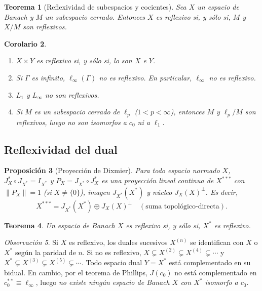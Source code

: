 \documentclass[11pt,a4paper]{article}
\newcommand{\norm}[1]{\lVert #1\rVert}
\theoremstyle{plain}
\newtheorem{teorema}{Teorema}[section]
\newtheorem{proposicion}[teorema]{Proposición}
\newtheorem{corolario}[teorema]{Corolario}
\theoremstyle{definition}
\theoremstyle{remark}
\newtheorem{observacion}[teorema]{Observación}
\begin{document}
\begin{teorema}[Reflexividad de subespacios y cocientes]
Sea $X$ un espacio de Banach y $M$ un subespacio cerrado. Entonces $X$ es reflexivo si, y sólo si, $M$ y $X/M$ son reflexivos.
\end{teorema}

\begin{corolario}
\begin{enumerate}[label=(\alph*)]
\item $X\times Y$ es reflexivo si, y sólo si, lo son $X$ e $Y$.
\item Si $\Gamma$ es infinito, $\ell_\infty(\Gamma)$ no es reflexivo. En particular, $\ell_\infty$ no es reflexivo.
\item $L_1$ y $L_\infty$ no son reflexivos.
\item Si $M$ es un subespacio cerrado de $\ell_p$ ($1<p<\infty$), entonces $M$ y $\ell_p/M$ son reflexivos, luego no son isomorfos a $c_0$ ni a $\ell_1$.
\end{enumerate}
\end{corolario}

\subsection{Reflexividad del dual}

\begin{proposicion}[Proyección de Dixmier]
Para todo espacio normado $X$, $J_X^*\circ J_{X^*}=I_{X^*}$ y $P_X=J_{X^*}\circ J_X^*$ es una proyección lineal continua de $X^{***}$ con $\norm{P_X}=1$ (si $X\neq\{0\}$), imagen $J_{X^*}(X^*)$ y núcleo $J_X(X)^\perp$. Es decir,
\[
X^{***}=J_{X^*}(X^*)\oplus J_X(X)^\perp \quad(\text{suma topológico-directa}).
\]
\end{proposicion}

\begin{teorema}
Un espacio de Banach $X$ es reflexivo si, y sólo si, $X^*$ es reflexivo.
\end{teorema}

\begin{observacion}
Si $X$ es reflexivo, los duales sucesivos $X^{(n)}$ se identifican con $X$ o $X^*$ según la paridad de $n$. Si no es reflexivo, $X\subsetneq X^{(2)}\subsetneq X^{(4)}\subsetneq\cdots$ y $X^*\subsetneq X^{(3)}\subsetneq X^{(5)}\subsetneq\cdots$. Todo espacio dual $Y=X^*$ está complementado en su bidual. En cambio, por el teorema de Phillips, $J(c_0)$ no está complementado en $c_0^{**}\equiv\ell_\infty$, luego \emph{no existe ningún espacio de Banach $X$ con $X^*$ isomorfo a $c_0$}.
\end{observacion}
\end{document}
